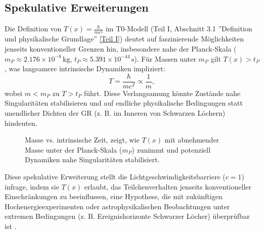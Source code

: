 \documentclass[12pt,a4paper]{article}
\newcommand{\Tfield}{T(x)}
\begin{document}
	\subsection{Spekulative Erweiterungen}
	\label{subsec:speculative_extensions}
	
	Die Definition von \(\Tfield = \frac{\hbar}{m c^2}\) im T0-Modell (Teil I, Abschnitt 3.1 ''Definition und physikalische Grundlage'' \href{https://github.com/jpascher/T0-Time-Mass-Duality/tree/main/2/pdf/Deutsch/Bridging Quantum Mechanics and Relativity through Time-Mass Duality Part I Theoretical Foundations.pdf}{[Teil I]}) deutet auf faszinierende Möglichkeiten jenseits konventioneller Grenzen hin, insbesondere nahe der Planck-Skala (\(m_P \approx 2.176 \times 10^{-8} \, \text{kg}\), \(t_P \approx 5.391 \times 10^{-44} \, \text{s}\)). Für Massen unter \(m_P\) gilt \(\Tfield > t_P\), was langsamere intrinsische Dynamiken impliziert:
	\begin{equation}
		T = \frac{\hbar}{m c^2} \propto \frac{1}{m},
		\label{eq:intrinsic_time_repeat}
	\end{equation}
	wobei \(m < m_P\) zu \(T > t_P\) führt. Diese Verlangsamung könnte Zustände nahe Singularitäten stabilisieren und auf endliche physikalische Bedingungen statt unendlicher Dichten der GR (z. B. im Inneren von Schwarzen Löchern) hindeuten.
	
	\begin{figure}[h]
		\centering
		\caption{Masse vs. intrinsische Zeit, zeigt, wie \(\Tfield\) mit abnehmender Masse unter der Planck-Skala (\(m_P\)) zunimmt und potenziell Dynamiken nahe Singularitäten stabilisiert.}
		\label{fig:mass_time}
	\end{figure}
	
	Diese spekulative Erweiterung stellt die Lichtgeschwindigkeitsbarriere (\(c = 1\)) infrage, indem sie \(\Tfield\) erlaubt, das Teilchenverhalten jenseits konventioneller Einschränkungen zu beeinflussen, eine Hypothese, die mit zukünftigen Hochenergieexperimenten oder astrophysikalischen Beobachtungen unter extremen Bedingungen (z. B. Ereignishorizonte Schwarzer Löcher) überprüfbar ist \cite{pascher_planck_2025}.
	
\end{document}
